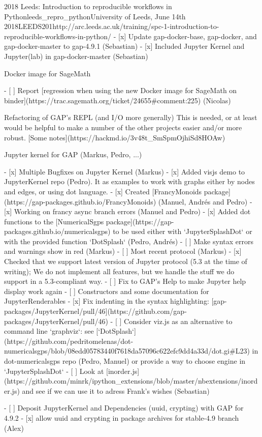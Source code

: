 \begin{Aim 1}
\begin{Aim 2}
\begin{event}{2018 Leeds: Introduction to reproducible workflows in Python}{leeds_repro_python}{University of Leeds, June 14th 2018}{LEEDS}{20}{1}{http://arc.leeds.ac.uk/training/spc-1-introduction-to-reproducible-workflows-in-python/}
- [x] Update gap-docker-base, gap-docker, and gap-docker-master to gap-4.9.1 (Sebastian)
- [x] Included Jupyter Kernel and Jupyter(lab) in gap-docker-master (Sebastian)

     Docker image for SageMath

- [ ] Report [regression when using the new Docker image for SageMath on binder](https://trac.sagemath.org/ticket/24655#comment:225) (Nicolas)

    Refactoring of GAP's REPL (and I/O more generally)
This is needed, or at least would be helpful to make a number of the other projects easier and/or more robust.
[Some notes](https://hackmd.io/3v48t_SmSpmOjhiSd8HOAw)

    Jupyter kernel for GAP (Markus, Pedro, ...)

- [x] Multiple Bugfixes on Jupyter Kernel (Markus)
- [x] Added visjs demo to JupyterKernel repo (Pedro). It as examples to work with graphs either by nodes and edges, or using dot language.
- [x] Created [FrancyMonoids package](https://gap-packages.github.io/FrancyMonoids) (Manuel, Andrés and Pedro)
- [x] Working on francy async branch errors (Manuel and Pedro) 
- [x] Added dot functions to the [NumericalSgps package](https://gap-packages.github.io/numericalsgps) to be used either with `JupyterSplashDot` or with the provided function `DotSplash` (Pedro, Andrés) 
- [ ] Make syntax errors and warnings show in red (Markus)
- [ ] Most recent protocol (Markus)
- [x] Checked that we support latest version of Jupyter protocol (5.3 at the time of writing); We do not implement all features, but we handle the stuff we do support in a 5.3-compliant way.
- [ ] Fix to GAP's Help to make Jupyter help display work again
- [ ]  Constructors and some documentation for JupyterRenderables
- [x] Fix indenting in the syntax highlighting: [gap-packages/JupyterKernel/pull/46](https://github.com/gap-packages/JupyterKernel/pull/46)
- [ ] Consider viz.js as an alternative to command line `graphviz`: see [`DotSplash`](https://github.com/pedritomelenas/dot-numericalsgps/blob/08edd05783440f7618da57096c622efc9dd4a33d/dot.gi#L23) in dot-numericalsgps repo (Pedro, Manuel) or provide a way to choose engine in `JupyterSplashDot`
- [ ] Look at [inorder.js](https://github.com/minrk/ipython_extensions/blob/master/nbextensions/inorder.js) and see if we can use it to adress Frank's wishes (Sebastian)


- [ ]  Deposit JupyterKernel and Dependencies (uuid, crypting) with GAP for 4.9.2
    - [x] allow uuid and crypting in package archives for stable-4.9 branch (Alex)



\end{event}
\end{Aim 2}
\end{Aim 1}

